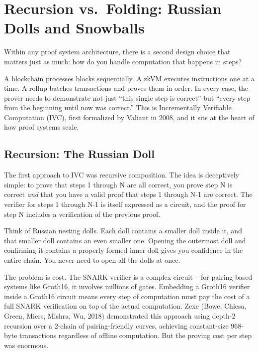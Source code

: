 \documentclass[
  11pt,
  openany]{report}
\begin{document}
\section{Recursion vs.~Folding: Russian Dolls and
Snowballs}\label{recursion-vs.-folding-russian-dolls-and-snowballs}

Within any proof system architecture, there is a second design choice that
matters just as much: how do you handle computation that happens in steps?

A blockchain processes blocks sequentially. A zkVM executes instructions one at
a time. A rollup batches transactions and proves them in order. In every case,
the prover needs to demonstrate not just ``this single step is correct'' but
``every step from the beginning until now was correct.'' This is Incrementally
Verifiable Computation (IVC), first formalized by Valiant in 2008, and it sits
at the heart of how proof systems scale.

\subsection{Recursion: The Russian Doll}\label{recursion-the-russian-doll}

The first approach to IVC was recursive composition. The idea is deceptively
simple: to prove that steps 1 through N are all correct, you prove step N is
correct \emph{and} that you have a valid proof that steps 1 through N-1 are
correct. The verifier for steps 1 through N-1 is itself expressed as a circuit,
and the proof for step N includes a verification of the previous proof.

Think of Russian nesting dolls. Each doll contains a smaller doll inside it, and
that smaller doll contains an even smaller one. Opening the outermost doll and
confirming it contains a properly formed inner doll gives you confidence in the
entire chain. You never need to open all the dolls at once.

The problem is cost. The SNARK verifier is a complex circuit -- for
pairing-based systems like Groth16, it involves millions of gates. Embedding a
Groth16 verifier inside a Groth16 circuit means every step of computation must
pay the cost of a full SNARK verification on top of the actual computation. Zexe
(Bowe, Chiesa, Green, Miers, Mishra, Wu, 2018) demonstrated this approach using
depth-2 recursion over a 2-chain of pairing-friendly curves, achieving
constant-size 968-byte transactions regardless of offline computation. But the
proving cost per step was enormous.
\end{document}

